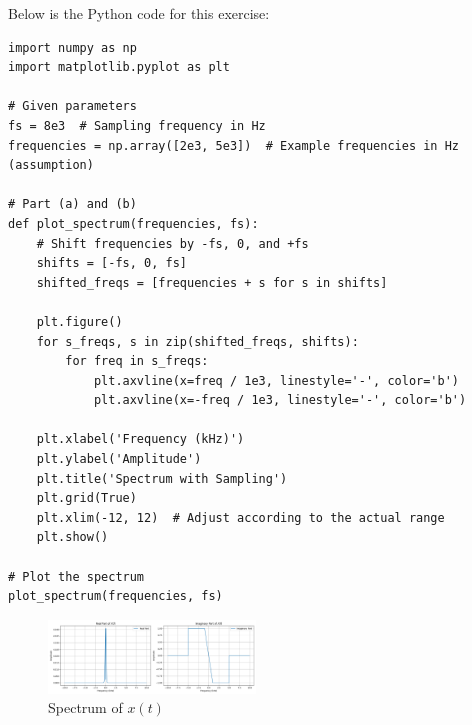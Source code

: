 
\item[(a)]
Below is the Python code for this exercise:

\begin{verbatim}
import numpy as np
import matplotlib.pyplot as plt

# Given parameters
fs = 8e3  # Sampling frequency in Hz
frequencies = np.array([2e3, 5e3])  # Example frequencies in Hz (assumption)

# Part (a) and (b)
def plot_spectrum(frequencies, fs):
    # Shift frequencies by -fs, 0, and +fs
    shifts = [-fs, 0, fs]
    shifted_freqs = [frequencies + s for s in shifts]

    plt.figure()
    for s_freqs, s in zip(shifted_freqs, shifts):
        for freq in s_freqs:
            plt.axvline(x=freq / 1e3, linestyle='-', color='b')
            plt.axvline(x=-freq / 1e3, linestyle='-', color='b')

    plt.xlabel('Frequency (kHz)')
    plt.ylabel('Amplitude')
    plt.title('Spectrum with Sampling')
    plt.grid(True)
    plt.xlim(-12, 12)  # Adjust according to the actual range
    plt.show()

# Plot the spectrum
plot_spectrum(frequencies, fs)
\end{verbatim}

\begin{figure}[h]
    \centering
    \includegraphics[width=0.49\textwidth]{fig/ex2_a_plot}
    \caption{Spectrum of \(x(t)\)}
    \label{fig:ex2_a_plot}
\end{figure}
